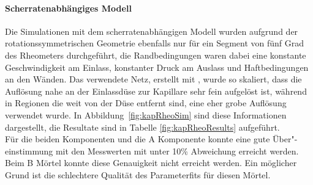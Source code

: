 \paragraph{Scherratenabhängiges Modell}
Die Simulationen mit dem scherratenabhängigen Modell wurden aufgrund der rotationssymmetrischen Geometrie ebenfalls nur für ein Segment von fünf Grad des Rheometers durchgeführt, die Randbedingungen waren dabei eine konstante Geschwindigkeit am Einlass, konstanter Druck am Auslass und Haftbedingungen an den Wänden. 
Das verwendete Netz, erstellt mit , wurde so skaliert, dass die Auflösung nahe an der Einlassdüse zur Kapillare sehr fein aufgelöst ist, während in Regionen die weit von der Düse entfernt sind, eine eher grobe Auflösung verwendet wurde. 
In Abbildung~\ref{fig:kapRheoSim} sind diese Informationen dargestellt, die Resultate sind in Tabelle \ref{fig:kapRheoResults} aufgeführt.\\
Für die beiden \moertelB{} Komponenten und die \moertelA{} A Komponente konnte eine gute Über"-einstimmung mit den Messwerten mit unter 10\% Ab\-wei\-chung erreicht werden. Beim \moertelA{} B Mörtel konnte diese Genauigkeit nicht erreicht werden. Ein möglicher Grund ist die schlechtere Qualität des Parameterfits für diesen Mörtel.
%
